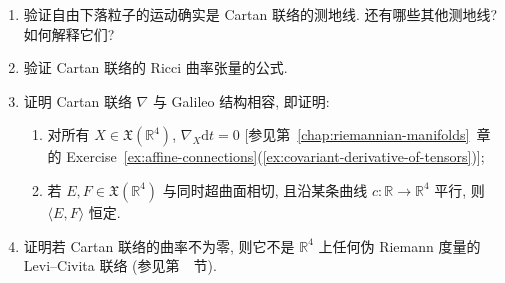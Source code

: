 \begin{RiemannExercise}\label{ex:cartan-connection}
\begin{enumerate}[label=(\arabic*),ref=\arabic*,leftmargin=*]
\item\label{ex:cartan-geodesics-as-free-fall} 验证自由下落粒子的运动确实是 Cartan 联络的测地线. 还有哪些其他测地线? 如何解释它们?
\item\label{ex:cartan-connection-ricci-curvature} 验证 Cartan 联络的 Ricci 曲率张量的公式.
\item\label{ex:cartan-connection-compatibility-with-galileo-structure} 证明 Cartan 联络 $\nabla$ 与 Galileo 结构相容, 即证明:
\begin{enumerate}[label=(\alph*),leftmargin=*]
\item 对所有 $X\in\mathfrak{X}(\mathbb{R}^4)$, $\nabla_X\mathrm{d}t=0$ [参见第~\ref{chap:riemannian-manifolds}~章的 Exercise~\ref{ex:affine-connections}(\ref{ex:covariant-derivative-of-tensors})];
\item 若 $E,F\in\mathfrak{X}(\mathbb{R}^4)$ 与同时超曲面相切, 且沿某条曲线 $c:\mathbb{R}\to\mathbb{R}^4$ 平行, 则 $\langle E,F\rangle$ 恒定.
\end{enumerate}
\item\label{ex:nonflat-cartan-connection-is-not-levi-civita}
证明若 Cartan 联络的曲率不为零, 则它不是 $\mathbb{R}^4$ 上任何伪 Riemann 度量的 Levi–Civita 联络 (参见第~~节).
\end{enumerate}
\end{RiemannExercise}
